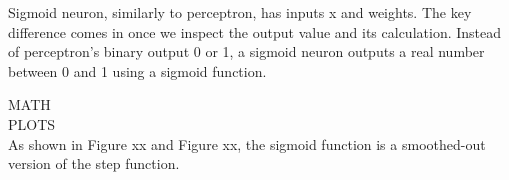 Sigmoid neuron, similarly to perceptron, has inputs x and weights. The key difference comes in once we inspect the output value and its calculation.
 Instead of perceptron's binary output 0 or 1, a sigmoid neuron outputs a real number between 0 and 1 using a sigmoid function.\cite{nndl2015michaelnielsen}\cite{rojas2013neural} \newline

 MATH\\
PLOTS\\

As shown in Figure xx and Figure xx, the sigmoid function is a smoothed-out version of the step function.\\
